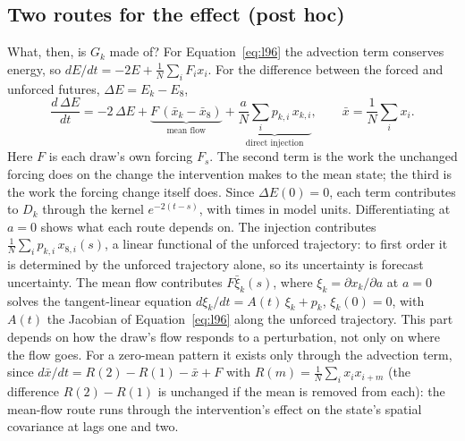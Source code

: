 \documentclass[11pt]{article}
\begin{document}
\subsection{Two routes for the effect (post hoc)}
\label{sec:routes}
What, then, is $G_k$ made of? For Equation~\eqref{eq:l96} the advection term conserves energy, so $dE/dt = -2E + \frac{1}{N}\sum_i F_i x_i$. For the difference between the forced and unforced futures, $\Delta E = E_k - E_8$,
\begin{equation}
\frac{d\,\Delta E}{dt} = -2\,\Delta E + \underbrace{F\,(\bar x_k - \bar x_8)}_{\text{mean flow}} + \underbrace{\frac{a}{N}\sum_i p_{k,i}\, x_{k,i}}_{\text{direct injection}},
\qquad \bar x = \frac{1}{N}\sum_i x_i .
\label{eq:budget}
\end{equation}
Here $F$ is each draw's own forcing $F_s$. The second term is the work the unchanged forcing does on the change the intervention makes to the mean state; the third is the work the forcing change itself does. Since $\Delta E(0) = 0$, each term contributes to $D_k$ through the kernel $e^{-2(t-s)}$, with times in model units. Differentiating at $a = 0$ shows what each route depends on. The injection contributes $\frac1N \sum_i p_{k,i}\, x_{8,i}(s)$, a linear functional of the unforced trajectory: to first order it is determined by the unforced trajectory alone, so its uncertainty is forecast uncertainty. The mean flow contributes $F \bar\xi_k(s)$, where $\xi_k = \partial x_k/\partial a$ at $a = 0$ solves the tangent-linear equation $d\xi_k/dt = A(t)\,\xi_k + p_k$, $\xi_k(0) = 0$, with $A(t)$ the Jacobian of Equation~\eqref{eq:l96} along the unforced trajectory. This part depends on how the draw's flow responds to a perturbation, not only on where the flow goes. For a zero-mean pattern it exists only through the advection term, since $d\bar x/dt = R(2) - R(1) - \bar x + F$ with $R(m) = \frac1N\sum_i x_i x_{i+m}$ (the difference $R(2) - R(1)$ is unchanged if the mean is removed from each): the mean-flow route runs through the intervention's effect on the state's spatial covariance at lags one and two.
\end{document}
